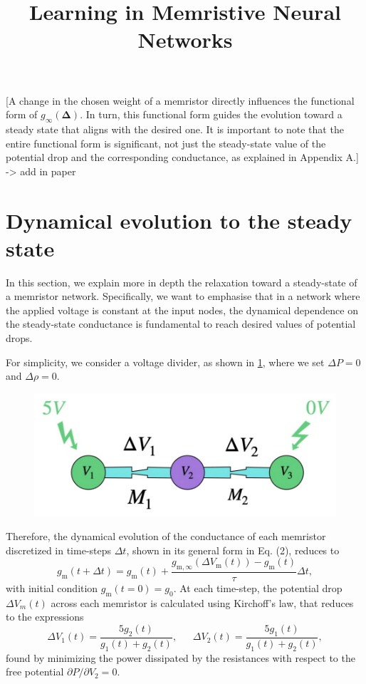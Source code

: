 \documentclass[10.5pt]{article}
\title{Learning in Memristive Neural Networks}
\date{}
\newcommand{\brac}[1]{\left(#1 \right)} %
\newcommand{\m}{\text{m}} %
\begin{document}



[A change in the chosen weight of a memristor directly influences the functional form of $g_{\infty}(\boldsymbol{\Delta})$. In turn, this functional form guides the evolution toward a steady state that aligns with the desired one. It is important to note that the entire functional form is significant, not just the steady-state value of the potential drop and the corresponding conductance, as explained in Appendix A.] -> add in paper

\section*{Dynamical evolution to the steady state}
In this section, we explain more in depth the relaxation toward a steady-state of a memristor network. Specifically, we want to emphasise that in a network where the applied voltage is constant at the input nodes, the dynamical dependence on the steady-state conductance is fundamental to reach desired values of potential drops. 


For simplicity, we consider a voltage divider, as shown in \cref{fig:app_vd}, where we set $\Delta P = 0$ and $\Delta \rho = 0$. 
\begin{figure}[H]
    \centering
    \includegraphics[width=0.5\columnwidth]{../plots/app_vd.pdf}
    \caption{}
    \label{fig:app_vd}
\end{figure} 
Therefore, the dynamical evolution of the conductance of each memristor discretized in time-steps $\Delta t$, shown in its general form in Eq. (2), reduces to
\begin{equation}
    g_{\m}\brac{t + \Delta t} = g_{\m}\brac{t} +
     \frac{g_{\m,\infty}\brac{\Delta V_{\m}(t)}-g_{\m}\brac{t}}{\tau}\Delta t,
\label{eq:conduct}
\end{equation}
with initial condition $g_{\m}(t=0)=g_0$. At each time-step, the potential drop $\Delta V_{m}(t)$ across each memristor is calculated using Kirchoff's law, that reduces to the expressions
\begin{equation}
    \Delta V_1(t) = \frac{5 g_2(t)}{g_1(t)+g_2(t)}, \ \ \ \ \ \ \ \Delta V_2(t) = \frac{5 g_1(t)}{g_1(t)+g_2(t)},
    \label{eq:potentials}
\end{equation}
found by minimizing the power dissipated by the resistances with respect to the free potential $\partial P/\partial V_2=0$.
\end{document}
